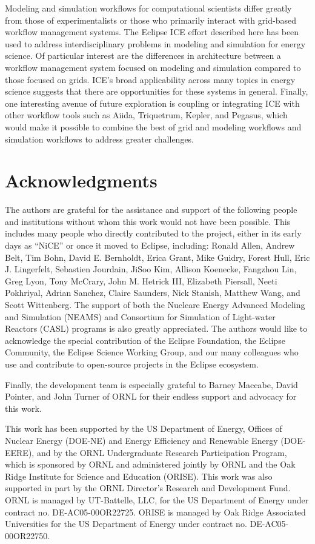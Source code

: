 Modeling and simulation workflows for computational scientists differ
greatly from those of experimentalists or those who primarily interact with
grid-based workflow management systems. The Eclipse ICE effort described here 
has been used to address interdisciplinary problems in 
modeling and simulation for energy science. Of particular interest are the
differences in architecture between a workflow management system focused
on modeling and simulation compared to those focused on grids. ICE's broad
applicability across many topics in energy science suggests that
there are opportunities for these systems in general. Finally, one 
interesting avenue of future exploration is coupling or integrating ICE 
with other workflow tools such as Aiida, Triquetrum, Kepler, and Pegasus,
which would make it possible to combine the best of grid and modeling workflows and
simulation workflows to address greater challenges.

\section*{Acknowledgments}\label{acknowledgments}

The authors are grateful for the assistance and support of the following
people and institutions without whom this work would not have been
possible. This includes many people who directly contributed to the
project, either in its early days as ``NiCE'' or once it moved to
Eclipse, including: Ronald Allen, Andrew Belt, Tim Bohn, David E.
Bernholdt, Erica Grant, Mike Guidry, Forest Hull, Eric J. Lingerfelt,
Sebastien Jourdain, JiSoo Kim, Allison Koenecke, Fangzhou Lin, Greg
Lyon, Tony McCrary, John M. Hetrick III, Elizabeth Piersall, Neeti
Pokhriyal, Adrian Sanchez, Claire Saunders, Nick Stanish, Matthew Wang, and
Scott Wittenberg. The support of both the Nucleare Energy Advanced Modeling and Simulation (NEAMS) and Consortium for Simulation of Light-water Reactors (CASL) programs is also
greatly appreciated. The authors would like to acknowledge the special
contribution of the Eclipse Foundation, the Eclipse Community, the
Eclipse Science Working Group, and our many colleagues who use and
contribute to open-source projects in the Eclipse ecosystem.

Finally, the development team is especially grateful to Barney Maccabe,
David Pointer, and John Turner of ORNL for their
endless support and advocacy for this work.

This work has been supported by the US Department of Energy, Offices of
Nuclear Energy (DOE-NE) and Energy Efficiency and Renewable Energy
(DOE-EERE), and by the ORNL Undergraduate Research Participation
Program, which is sponsored by ORNL and administered jointly by ORNL and
the Oak Ridge Institute for Science and Education (ORISE). This work was
also supported in part by the ORNL Director's
Research and Development Fund. ORNL is managed by UT-Battelle, LLC, for
the US Department of Energy under contract no. DE-AC05-00OR22725. ORISE
is managed by Oak Ridge Associated Universities for the US Department of
Energy under contract no. DE-AC05-00OR22750.

